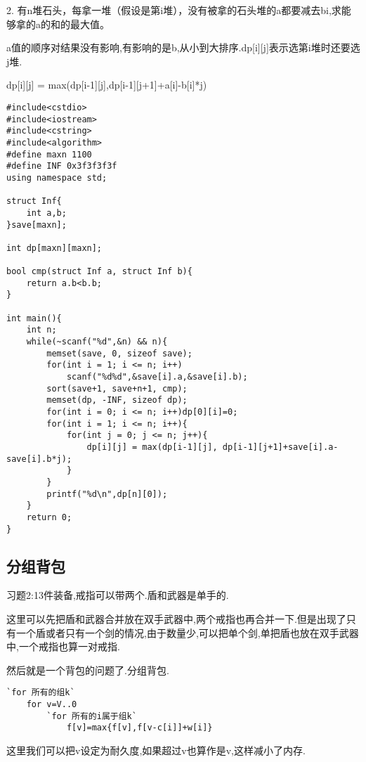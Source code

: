 2. 有n堆石头，每拿一堆（假设是第i堆），没有被拿的石头堆的a都要减去bi,求能够拿的a的和的最大值。

a值的顺序对结果没有影响,有影响的是b,从小到大排序.dp[i][j]表示选第i堆时还要选j堆.

dp[i][j] = max(dp[i-1][j],dp[i-1][j+1]+a[i]-b[i]*j)

\begin{lstlisting}
#include<cstdio>
#include<iostream>
#include<cstring>
#include<algorithm>
#define maxn 1100
#define INF 0x3f3f3f3f
using namespace std;

struct Inf{
    int a,b;
}save[maxn];

int dp[maxn][maxn];

bool cmp(struct Inf a, struct Inf b){
    return a.b<b.b;
}

int main(){
    int n;
    while(~scanf("%d",&n) && n){
        memset(save, 0, sizeof save);
        for(int i = 1; i <= n; i++)
            scanf("%d%d",&save[i].a,&save[i].b);
        sort(save+1, save+n+1, cmp);
        memset(dp, -INF, sizeof dp);
        for(int i = 0; i <= n; i++)dp[0][i]=0;
        for(int i = 1; i <= n; i++){
            for(int j = 0; j <= n; j++){
                dp[i][j] = max(dp[i-1][j], dp[i-1][j+1]+save[i].a-save[i].b*j);
            }
        }
        printf("%d\n",dp[n][0]);
    }
    return 0;
}
\end{lstlisting}


\subsection{分组背包}

习题2:13件装备,戒指可以带两个.盾和武器是单手的.

这里可以先把盾和武器合并放在双手武器中,两个戒指也再合并一下.但是出现了只有一个盾或者只有一个剑的情况,由于数量少,可以把单个剑,单把盾也放在双手武器中,一个戒指也算一对戒指.

然后就是一个背包的问题了.分组背包.


\begin{lstlisting}
`for 所有的组k`
    for v=V..0
        `for 所有的i属于组k`
            f[v]=max{f[v],f[v-c[i]]+w[i]}
\end{lstlisting}


这里我们可以把v设定为耐久度,如果超过v也算作是v,这样减小了内存.

